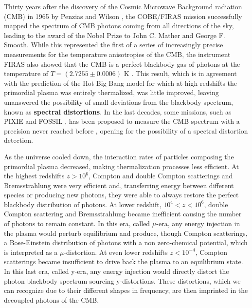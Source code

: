 Thirty years after the discovery of the Cosmic Microwave Background radiation (CMB) in 1965 by Penzias and Wilson \cite{1965ApJ...142..419P}, the COBE/FIRAS mission \cite{COBE1996} successfully mapped the spectrum of CMB photons coming from all directions of the sky, leading to the award of the Nobel Prize to John C. Mather and George F. Smooth. While this represented the first of a series of increasingly precise measurements for the temperature anisotropies of the CMB, the instrument FIRAS also showed that the CMB is a perfect blackbody gas of photons at the temperature of $T=(2.7255\pm0.0006)$ K \cite{COBE1996}. This result, which is in agreement with the prediction of the Hot Big Bang model for which at high redshifts the primordial plasma was entirely thermalized, was little improved, leaving unanswered the possibility of small deviations from the blackbody spectrum, known as \textbf{spectral distortions}. In the last decades, some missions, such as PIXIE \cite{pixie} and FOSSIL \cite{IAS_Fossil}, has been proposed to measure the CMB spectrum with a precision never reached before \cite{Chluba_2021}, opening for the possibility of a spectral distortion detection.

As the universe cooled down, the interaction rates of particles composing the primordial plasma decreased, making thermalization processes less efficient. At the highest redshifts $z>10^{6}$, Compton and double Compton scatterings and Bremsstrahlung were very efficient and, transferring energy between different species or producing new photons, they were able to always restore the perfect blackbody distribution of photons. At lower redshift, $10^{4}<z<10^{6}$, double Compton scattering and Bremsstrahlung became inefficient causing the number of photons to remain constant. In this era, called $\mu$-era, any energy injection in the plasma would perturb equilibrium and produce, though Compton scatterings, a Bose-Einstein distribution of photons with a non zero-chemical potential, which is interpreted as a $\mu$-distortion. At even lower redshifts $z<10^{-4}$, Compton scatterings became insufficient to drive back the plasma to an equilibrium state. In this last era, called y-era, any energy injection would directly distort the photon blackbody spectrum sourcing y-distortions. These distortions, which we can recognize due to their different shapes in frequency, are then imprinted in the decoupled photons of the CMB.

